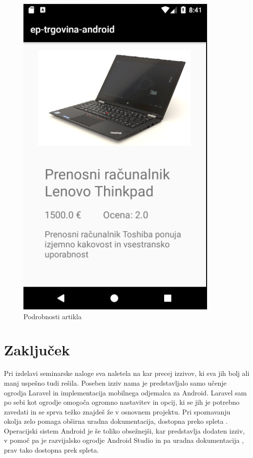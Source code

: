 \documentclass[a4paper,12pt]{report}
\begin{document}
\begin{figure}[h]
  \includegraphics[scale=0.5]{slike/android/ProductDetailActivity.png}
    \caption{Podrobnosti artikla}
    \label{fig:product_detail_activity}
\endminipage\hfill
\end{figure}


\chapter{Zaključek}

Pri izdelavi seminarske naloge sva naletela na kar precej izzivov, ki sva jih bolj ali manj uspešno tudi rešila. Poseben izziv nama je predstavljalo samo učenje ogrodja Laravel in implementacija mobilnega odjemalca za Android. Laravel sam po sebi kot ogrodje omogoča ogromno nastavitev in opcij, ki se jih je potrebno zavedati in se sprva težko znajdeš že v osnovnem projektu. Pri spoznavanju okolja zelo pomaga obširna uradna dokumentacija, dostopna preko spleta \cite{bib:laravel}. Operacijski sistem Android je še toliko obsežnejši, kar predstavlja dodaten izziv, v pomoč pa je razvijalsko ogrodje Android Studio in pa uradna dokumentacija \cite{bib:android}, prav tako dostopna prek spleta.
\end{document}
